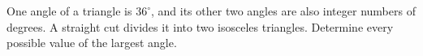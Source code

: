 One angle of a triangle is $36^\circ$, and its other two angles are also integer numbers of degrees. A straight cut divides it into two isosceles triangles. Determine every possible value of the largest angle.
